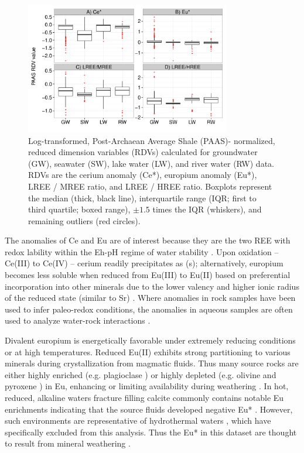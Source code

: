 \begin{figure}[htbp]
\begin{center}
\includegraphics[width=0.8\textwidth]{Ch3_figures/REE-waters-RDV-boxplots.pdf}
\caption{Log-transformed, Post-Archaean Average Shale (PAAS)- normalized, reduced dimension variables (RDVs) calculated for groundwater (GW), seawater (SW), lake water (LW), and river water (RW) data.
RDVs are the cerium anomaly (Ce*), europium anomaly (Eu*), LREE / MREE ratio, and LREE / HREE ratio.
Boxplots represent the median (thick, black line), interquartile range (IQR; first to third quartile; boxed range), $\pm1.5$ times the IQR (whiskers), and remaining outliers (red circles).}\label{fig:all_RDV}
\end{center}
\end{figure}

The anomalies of Ce and Eu are of interest because they are the two REE with redox lability within the Eh-pH regime of water stability \citep{Brookins_GJ_1983}.
Upon oxidation -- Ce(III) to Ce(IV) -- cerium readily precipitates as (s);
alternatively, europium becomes less soluble when reduced from Eu(III) to Eu(II) based on preferential incorporation into other minerals due to the lower valency and higher ionic radius of the reduced state (similar to Sr) \citep{Brookins_RMG_1989}.
Where anomalies in rock samples have been used to infer paleo-redox conditions, the anomalies in aqueous samples are often used to analyze water-rock interactions \citep{Willis_CG_2011, Smedley_GCA_1991}.

Divalent europium is energetically favorable under extremely reducing conditions or at high temperatures.
Reduced Eu(II) exhibits strong partitioning to various minerals during crystallization from magmatic fluids.
Thus many source rocks are either highly enriched (e.g. plagioclase \citep{Nash_GCA_1985}) or highly depleted (e.g. olivine \citep{Foley_Lithos_2004} and pyroxene \citep{Hanson_EPS_1980}) in Eu, enhancing or limiting availability during weathering \citep{Sverjensky_EPSL_1984}.
In hot, reduced, alkaline waters fracture filling calcite commonly contains notable Eu enrichments indicating that the source fluids developed negative Eu* \citep{Lee_AG_2003, Cai_AG_2008}.
However, such environments are representative of hydrothermal waters \citep{Sverjensky_EPSL_1984}, which have specifically excluded from this analysis.
Thus the Eu* in this dataset are thought to result from mineral weathering \citep{Sverjensky_EPSL_1984}.

